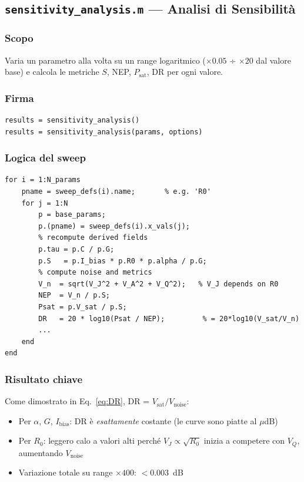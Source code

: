 \documentclass[11pt,a4paper]{article}
\begin{document}
\subsection{\texttt{sensitivity\_analysis.m} --- Analisi di Sensibilità}

\subsubsection*{Scopo}
Varia un parametro alla volta su un range logaritmico
($\times 0.05$ ÷ $\times 20$ dal valore base) e calcola le metriche
$S$, NEP, $P_{\text{sat}}$, DR per ogni valore.

\subsubsection*{Firma}
\begin{lstlisting}
results = sensitivity_analysis()
results = sensitivity_analysis(params, options)
\end{lstlisting}

\subsubsection*{Logica del sweep}

\begin{lstlisting}[caption={Cuore di sensitivity\_analysis.m}]
for i = 1:N_params
    pname = sweep_defs(i).name;       % e.g. 'R0'
    for j = 1:N
        p = base_params;
        p.(pname) = sweep_defs(i).x_vals(j);
        % recompute derived fields
        p.tau = p.C / p.G;
        p.S   = p.I_bias * p.R0 * p.alpha / p.G;
        % compute noise and metrics
        V_n  = sqrt(V_J^2 + V_A^2 + V_Q^2);   % V_J depends on R0
        NEP  = V_n / p.S;
        Psat = p.V_sat / p.S;
        DR   = 20 * log10(Psat / NEP);         % = 20*log10(V_sat/V_n)
        ...
    end
end
\end{lstlisting}

\subsubsection*{Risultato chiave}

Come dimostrato in Eq.~\eqref{eq:DR}, DR = $V_{\text{sat}}/V_{\text{noise}}$:
\begin{itemize}[noitemsep]
  \item Per $\alpha$, $G$, $I_{\text{bias}}$: DR è \emph{esattamente} costante
        (le curve sono piatte al $\mu$dB)
  \item Per $R_0$: leggero calo a valori alti perché $V_J \propto \sqrt{R_0}$
        inizia a competere con $V_Q$, aumentando $V_{\text{noise}}$
  \item Variazione totale su range $\times 400$: $< 0.003$~dB
\end{itemize}
\end{document}
